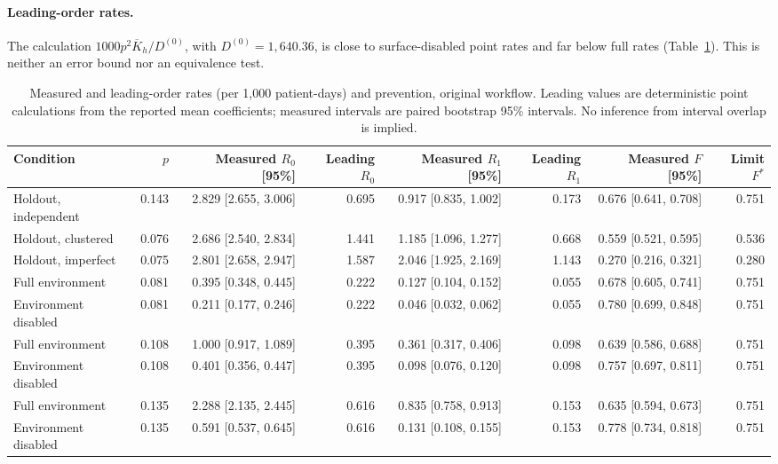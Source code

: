 \documentclass[11pt]{article}
\begin{document}
\paragraph{Leading-order rates.} The calculation
$1000p^2\overline K_h/D^{(0)}$, with $D^{(0)}=1{,}640.36$, is close to
surface-disabled point rates and far below full rates
(Table~\ref{tab:leading}). This is neither an error bound nor an equivalence test.

\begin{table}[htbp]\centering\footnotesize\setlength{\tabcolsep}{4pt}
\caption{Measured and leading-order rates (per 1,000 patient-days) and prevention, original workflow. Leading values are deterministic point calculations from the reported mean coefficients; measured intervals are paired bootstrap 95\% intervals. No inference from interval overlap is implied.}\label{tab:leading}
\begin{adjustbox}{max width=\linewidth}
\begin{tabular}{lrrrrrrr}\toprule
Condition & $p$ & Measured $R_0$ [95\%] & Leading $R_0$ & Measured $R_1$ [95\%] & Leading $R_1$ & Measured $F$ [95\%] & Limit $F^*$\\\midrule
Holdout, independent & 0.143 & 2.829 [2.655, 3.006] & 0.695 & 0.917 [0.835, 1.002] & 0.173 & 0.676 [0.641, 0.708] & 0.751\\
Holdout, clustered & 0.076 & 2.686 [2.540, 2.834] & 1.441 & 1.185 [1.096, 1.277] & 0.668 & 0.559 [0.521, 0.595] & 0.536\\
Holdout, imperfect & 0.075 & 2.801 [2.658, 2.947] & 1.587 & 2.046 [1.925, 2.169] & 1.143 & 0.270 [0.216, 0.321] & 0.280\\
Full environment & 0.081 & 0.395 [0.348, 0.445] & 0.222 & 0.127 [0.104, 0.152] & 0.055 & 0.678 [0.605, 0.741] & 0.751\\
Environment disabled & 0.081 & 0.211 [0.177, 0.246] & 0.222 & 0.046 [0.032, 0.062] & 0.055 & 0.780 [0.699, 0.848] & 0.751\\
Full environment & 0.108 & 1.000 [0.917, 1.089] & 0.395 & 0.361 [0.317, 0.406] & 0.098 & 0.639 [0.586, 0.688] & 0.751\\
Environment disabled & 0.108 & 0.401 [0.356, 0.447] & 0.395 & 0.098 [0.076, 0.120] & 0.098 & 0.757 [0.697, 0.811] & 0.751\\
Full environment & 0.135 & 2.288 [2.135, 2.445] & 0.616 & 0.835 [0.758, 0.913] & 0.153 & 0.635 [0.594, 0.673] & 0.751\\
Environment disabled & 0.135 & 0.591 [0.537, 0.645] & 0.616 & 0.131 [0.108, 0.155] & 0.153 & 0.778 [0.734, 0.818] & 0.751\\
\bottomrule\end{tabular}
\end{adjustbox}
\end{table}
\end{document}
